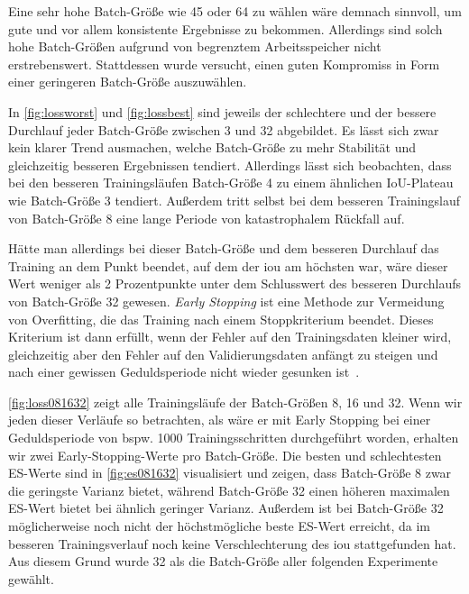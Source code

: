 

Eine sehr hohe Batch-Größe wie 45 oder 64 zu wählen wäre demnach sinnvoll, um gute und vor allem konsistente Ergebnisse zu bekommen.
Allerdings sind solch hohe Batch-Größen aufgrund von begrenztem Arbeitsspeicher nicht erstrebenswert.
Stattdessen wurde versucht, einen guten Kompromiss in Form einer geringeren Batch-Größe auszuwählen.

In \autoref{fig:lossworst} und \autoref{fig:lossbest} sind jeweils der schlechtere und der bessere Durchlauf jeder Batch-Größe zwischen 3 und 32 abgebildet.
Es lässt sich zwar kein klarer Trend ausmachen, welche Batch-Größe zu mehr Stabilität und gleichzeitig besseren Ergebnissen tendiert.
Allerdings lässt sich beobachten, dass bei den besseren Trainingsläufen Batch-Größe 4 zu einem ähnlichen IoU-Plateau wie Batch-Größe 3 tendiert.
Außerdem tritt selbst bei dem besseren Trainingslauf von Batch-Größe 8 eine lange Periode von katastrophalem Rückfall auf.



Hätte man allerdings bei dieser Batch-Größe und dem besseren Durchlauf das Training an dem Punkt beendet, auf dem der \gls{iou} am höchsten war, wäre dieser Wert weniger als 2 Prozentpunkte unter dem Schlusswert des besseren Durchlaufs von Batch-Größe 32 gewesen.
\emph{Early Stopping} ist eine Methode zur Vermeidung von Overfitting, die das Training nach einem Stoppkriterium beendet.
Dieses Kriterium ist dann erfüllt, wenn der Fehler auf den Trainingsdaten kleiner wird, gleichzeitig aber den Fehler auf den Validierungsdaten anfängt zu steigen und nach einer gewissen Geduldsperiode nicht wieder gesunken ist~\cite{Goodfellow.2016}.

\autoref{fig:loss081632} zeigt alle Trainingsläufe der Batch-Größen 8, 16 und 32.
Wenn wir jeden dieser Verläufe so betrachten, als wäre er mit Early Stopping bei einer Geduldsperiode von bspw. 1000 Trainingsschritten durchgeführt worden, erhalten wir zwei Early-Stopping-Werte pro Batch-Größe.
Die besten und schlechtesten ES-Werte sind in \autoref{fig:es081632} visualisiert und zeigen, dass Batch-Größe 8 zwar die geringste Varianz bietet, während Batch-Größe 32 einen höheren maximalen ES-Wert bietet bei ähnlich geringer Varianz.
Außerdem ist bei Batch-Größe 32 möglicherweise noch nicht der höchstmögliche beste ES-Wert erreicht, da im besseren Trainingsverlauf noch keine Verschlechterung des \gls{iou} stattgefunden hat.
Aus diesem Grund wurde 32 als die Batch-Größe aller folgenden Experimente gewählt.

